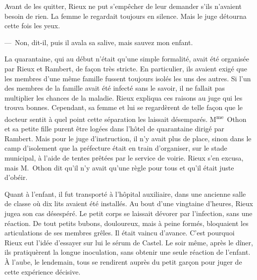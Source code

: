 \documentclass[french,twoside]{book} %
\begin{document}
Avant de les quitter, Rieux ne put s’empêcher de leur demander s’ils n’avaient besoin de rien. La femme le regardait toujours en silence. Mais le juge détourna cette fois les yeux.\par
— Non, dit-il, puis il avala sa salive, mais sauvez mon enfant.\par
La quarantaine, qui au début n’était qu’une simple formalité, avait été organisée par Rieux et Rambert, de façon très stricte. En particulier, ils avaient exigé que les membres d’une même famille fussent toujours isolés les uns des autres. Si l’un des membres de la famille avait été infecté sans le savoir, il ne fallait pas multiplier les chances de la maladie. Rieux expliqua ces raisons au juge qui les trouva bonnes. Cependant, sa femme et lui se regardèrent de telle façon que le docteur sentit à quel point cette séparation les laissait désemparés. M\textsuperscript{me} Othon et sa petite fille purent être logées dans l’hôtel de quarantaine dirigé par Rambert. Mais pour le juge d’instruction, il n’y avait plus de place, sinon dans le camp d’isolement que la préfecture était en train d’organiser, sur le stade municipal, à l’aide de tentes prêtées par le service de voirie. Rieux s’en excusa, mais M. Othon dit qu’il n’y avait qu’une règle pour tous et qu’il était juste d’obéir.\par
Quant à l’enfant, il fut transporté à l’hôpital auxiliaire, dans une ancienne salle de classe où dix lits avaient été installés. Au bout d’une vingtaine d’heures, Rieux jugea son cas désespéré. Le petit corps se laissait dévorer par l’infection, sans une réaction. De tout petits bubons, douloureux, mais à peine formés, bloquaient les articulations de ses membres grêles. Il était vaincu d’avance. C’est pourquoi Rieux eut l’idée d’essayer sur lui le sérum de Castel. Le soir même, après le dîner, ils pratiquèrent la longue inoculation, sans obtenir une seule réaction de l’enfant. À l’aube, le lendemain, tous se rendirent auprès du petit garçon pour juger de cette expérience décisive.\par
\end{document}
